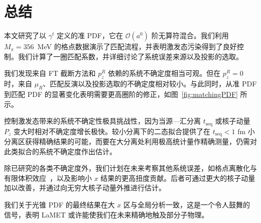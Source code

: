 \section{总结}\label{sec:summary}

本文研究了以 $\gamma^t$ 定义的准 PDF，它在 $\mathcal{O}(a^0)$ 阶无算符混合。我们利用 $M_\pi=356$~MeV 的格点数据演示了匹配流程，并表明激发态污染得到了良好控制。我们计算了一圈匹配系数，并详细讨论了系统误差来源以及投影的选取。

我们发现来自 FT 截断方法和 $p_z^R$ 依赖的系统不确定度相当可观。但在 $p_z^R=0$ 时，来自 $\mu_R$、匹配反演以及投影选取的不确定度相对较小。与此同时，从准 PDF 到匹配 PDF 的显著变化表明需要更高圈阶的修正，如图~\ref{fig:matchingPDF} 所示。

控制激发态带来的系统不确定性极具挑战性，因为当源—汇分离 $t_\text{seq}$ 或核子动量 $P_z$ 变大时相对不确定度增长极快。较小分离下的二态拟合提供了在 $t_\text{seq}<1$ fm 小分离区获得精确结果的可能，而要在大分离处利用极高统计量作精确测量，仍需对此类拟合的系统不确定度作出估计。

除已研究的各类不确定度外，我们计划在未来考察其他系统误差，如格点离散化与有限体积效应~\cite{Lin:2019ocg}，以及影响小 $x$ 结果的更高扭度贡献。后者可通过更大的核子动量加以改善，并通过向无穷大核子动量外推进行估计。

我们关于光锥 PDF 的最终结果在大 $x$ 区与全局分析一致，这是一个令人鼓舞的信号，表明 LaMET 或许能使我们在未来精确地触及部分子物理。
